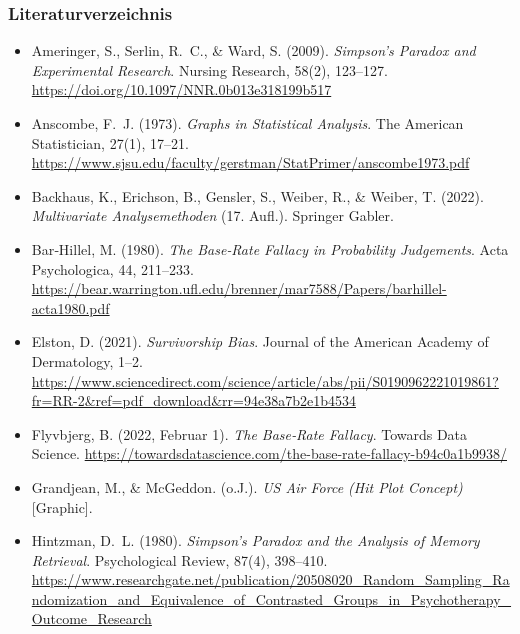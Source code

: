 \documentclass{beamer}
\renewcommand{\footnotesize}{\tiny}
\begin{document}
\begin{frame}
\frametitle{Literaturverzeichnis}
\footnotesize
\begin{itemize}
    \item Ameringer, S., Serlin, R.\ C., \& Ward, S. (2009). \textit{Simpson’s Paradox and Experimental Research}. Nursing Research, 58(2), 123–127.
    \url{https://doi.org/10.1097/NNR.0b013e318199b517}
    \item Anscombe, F.\ J. (1973). \textit{Graphs in Statistical Analysis}. The American Statistician, 27(1), 17–21.  
    \url{https://www.sjsu.edu/faculty/gerstman/StatPrimer/anscombe1973.pdf}
    \item Backhaus, K., Erichson, B., Gensler, S., Weiber, R., \& Weiber, T. (2022). \textit{Multivariate Analysemethoden} (17. Aufl.). Springer Gabler.
    \item Bar‑Hillel, M. (1980). \textit{The Base‑Rate Fallacy in Probability Judgements}. Acta Psychologica, 44, 211–233.  
    \url{https://bear.warrington.ufl.edu/brenner/mar7588/Papers/barhillel-acta1980.pdf}
    \item Elston, D. (2021). \textit{Survivorship Bias}. Journal of the American Academy of Dermatology, 1–2.  
    \url{https://www.sciencedirect.com/science/article/abs/pii/S0190962221019861?fr=RR-2&ref=pdf_download&rr=94e38a7b2e1b4534}
    \item Flyvbjerg, B. (2022, Februar 1). \textit{The Base‑Rate Fallacy}. Towards Data Science.  
    \url{https://towardsdatascience.com/the-base-rate-fallacy-b94c0a1b9938/}
    \item Grandjean, M., \& McGeddon. (o.\ J.). \textit{US Air Force (Hit Plot Concept)} [Graphic].
    \item Hintzman, D.\ L. (1980). \textit{Simpson’s Paradox and the Analysis of Memory Retrieval}. Psychological Review, 87(4), 398--410. \url{https://www.researchgate.net/publication/20508020_Random_Sampling_Randomization_and_Equivalence_of_Contrasted_Groups_in_Psychotherapy_Outcome_Research}
   
\end{itemize}
\end{frame}
\end{document}
